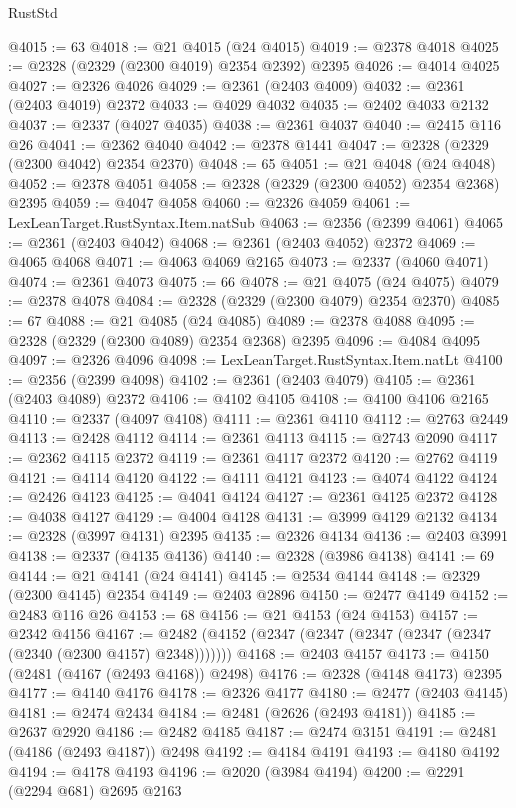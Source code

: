 \begin{lexlean}{RustStd}
\begin{coremodule}
@4015 := 63
@4018 := @21 @4015 (@24 @4015)
@4019 := @2378 @4018
@4025 := @2328 (@2329 (@2300 @4019) @2354 @2392) @2395
@4026 := @4014 @4025
@4027 := @2326 @4026
@4029 := @2361 (@2403 @4009)
@4032 := @2361 (@2403 @4019) @2372
@4033 := @4029 @4032
@4035 := @2402 @4033 @2132
@4037 := @2337 (@4027 @4035)
@4038 := @2361 @4037
@4040 := @2415 @116 @26
@4041 := @2362 @4040
@4042 := @2378 @1441
@4047 := @2328 (@2329 (@2300 @4042) @2354 @2370)
@4048 := 65
@4051 := @21 @4048 (@24 @4048)
@4052 := @2378 @4051
@4058 := @2328 (@2329 (@2300 @4052) @2354 @2368) @2395
@4059 := @4047 @4058
@4060 := @2326 @4059
@4061 := LexLeanTarget.RustSyntax.Item.natSub
@4063 := @2356 (@2399 @4061)
@4065 := @2361 (@2403 @4042)
@4068 := @2361 (@2403 @4052) @2372
@4069 := @4065 @4068
@4071 := @4063 @4069 @2165
@4073 := @2337 (@4060 @4071)
@4074 := @2361 @4073
@4075 := 66
@4078 := @21 @4075 (@24 @4075)
@4079 := @2378 @4078
@4084 := @2328 (@2329 (@2300 @4079) @2354 @2370)
@4085 := 67
@4088 := @21 @4085 (@24 @4085)
@4089 := @2378 @4088
@4095 := @2328 (@2329 (@2300 @4089) @2354 @2368) @2395
@4096 := @4084 @4095
@4097 := @2326 @4096
@4098 := LexLeanTarget.RustSyntax.Item.natLt
@4100 := @2356 (@2399 @4098)
@4102 := @2361 (@2403 @4079)
@4105 := @2361 (@2403 @4089) @2372
@4106 := @4102 @4105
@4108 := @4100 @4106 @2165
@4110 := @2337 (@4097 @4108)
@4111 := @2361 @4110
@4112 := @2763 @2449
@4113 := @2428 @4112
@4114 := @2361 @4113
@4115 := @2743 @2090
@4117 := @2362 @4115 @2372
@4119 := @2361 @4117 @2372
@4120 := @2762 @4119
@4121 := @4114 @4120
@4122 := @4111 @4121
@4123 := @4074 @4122
@4124 := @2426 @4123
@4125 := @4041 @4124
@4127 := @2361 @4125 @2372
@4128 := @4038 @4127
@4129 := @4004 @4128
@4131 := @3999 @4129 @2132
@4134 := @2328 (@3997 @4131) @2395
@4135 := @2326 @4134
@4136 := @2403 @3991
@4138 := @2337 (@4135 @4136)
@4140 := @2328 (@3986 @4138)
@4141 := 69
@4144 := @21 @4141 (@24 @4141)
@4145 := @2534 @4144
@4148 := @2329 (@2300 @4145) @2354
@4149 := @2403 @2896
@4150 := @2477 @4149
@4152 := @2483 @116 @26
@4153 := 68
@4156 := @21 @4153 (@24 @4153)
@4157 := @2342 @4156
@4167 := @2482 (@4152 (@2347 (@2347 (@2347 (@2347 (@2347 (@2340 (@2300 @4157) @2348)))))))
@4168 := @2403 @4157
@4173 := @4150 (@2481 (@4167 (@2493 @4168)) @2498)
@4176 := @2328 (@4148 @4173) @2395
@4177 := @4140 @4176
@4178 := @2326 @4177
@4180 := @2477 (@2403 @4145)
@4181 := @2474 @2434
@4184 := @2481 (@2626 (@2493 @4181))
@4185 := @2637 @2920
@4186 := @2482 @4185
@4187 := @2474 @3151
@4191 := @2481 (@4186 (@2493 @4187)) @2498
@4192 := @4184 @4191
@4193 := @4180 @4192
@4194 := @4178 @4193
@4196 := @2020 (@3984 @4194)
@4200 := @2291 (@2294 @681) @2695 @2163

\end{coremodule}
\end{lexlean}
